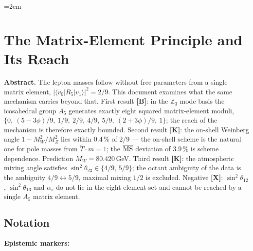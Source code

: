 \providecommand{\BM}{\textbf{[B]}}
\providecommand{\KM}{\textbf{[K]}}
\providecommand{\SM}{\textbf{[S]}}
\providecommand{\EM}{\textbf{[E]}}
\providecommand{\XM}{\textbf{[X]}}

\sloppy
\emergencystretch=2em
\chapter*{The Matrix-Element Principle and Its Reach}

{\small\noindent\textbf{Abstract.}\quad\ignorespaces
The lepton masses follow without free parameters from a single matrix
element, $|\langle v_0|R_5|v_1\rangle|^2 = 2/9$. This document examines what
the same mechanism carries beyond that. First result \BM: in the
$\mathbb Z_3$ mode basis the icosahedral group $A_5$ generates exactly eight
squared matrix-element moduli, $\{0,\ (5-3\phi)/9,\ 1/9,\ 2/9,\ 4/9,\ 5/9,\
(2+3\phi)/9,\ 1\}$; the reach of the mechanism is therefore exactly bounded.
Second result \KM: the on-shell Weinberg angle $1-M_W^2/M_Z^2$ lies within
$0.4\,\%$ of $2/9$ --- the on-shell scheme is the natural one for pole masses
from $\tilde T\cdot m=1$; the $\overline{\rm MS}$ deviation of $3.9\,\%$ is
scheme dependence. Prediction $M_W = 80.420$\,GeV. Third result \KM: the
atmospheric mixing angle satisfies $\sin^2\theta_{23}\in\{4/9,\,5/9\}$; the
octant ambiguity of the data is the ambiguity $4/9\leftrightarrow 5/9$,
maximal mixing $1/2$ is excluded. Negative \XM: $\sin^2\theta_{12}$,
$\sin^2\theta_{13}$ and $\alpha_s$ do not lie in the eight-element set and
cannot be reached by a single $A_5$ matrix element.
}\medskip

\section*{Notation}

\medskip
\textbf{Epistemic markers:}\par\medskip


